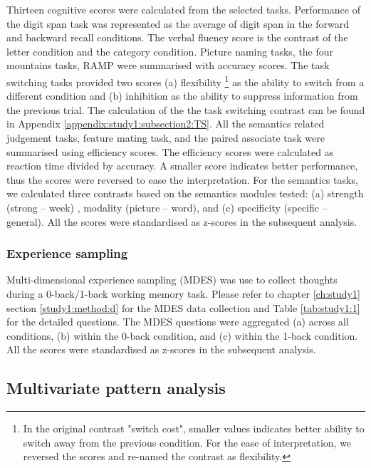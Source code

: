 Thirteen cognitive scores were calculated from the selected tasks. Performance of the digit span task was represented as the average of digit span in the forward and backward recall conditions. The verbal fluency score is the contrast of the letter condition and the category condition. Picture naming tasks, the four mountains tasks, RAMP were summarised with accuracy scores. The task switching tasks provided two scores (a) flexibility
\footnote{In the original contrast "switch cost", smaller values indicates better ability to switch away from the previous condition. For the ease of interpretation, we reversed the scores and re-named the contrast as flexibility.} 
as the ability to switch from a different condition and (b) inhibition as the ability to suppress information from the previous trial. The calculation of the the task switching contrast can be found in Appendix \ref{appendix:study1:subsection2:TS}. All the semantics related judgement tasks, feature mating task, and the paired associate task were summarised using efficiency scores. The efficiency scores were calculated as reaction time divided by accuracy. A smaller score indicates better performance, thus the scores were reversed to ease the interpretation. For the semantics tasks, we calculated three contrasts based on the semantics modules tested: (a) strength (strong -- week) , modality (picture -- word), and (c) specificity (specific -- general). All the scores were standardised as z-scores in the subsequent analysis. 

\subsubsection{Experience sampling}
\label{study3:method:e:mdes}
Multi-dimensional experience sampling (MDES) was use to collect thoughts during a 0-back/1-back working memory task. Please refer to chapter \ref{ch:study1} section \ref{study1:method:d} for the MDES data collection and Table \ref{tab:study1:1} for the detailed questions. The MDES questions were aggregated (a) across all conditions, (b) within the 0-back condition, and (c) within the 1-back condition. All the scores were standardised as z-scores in the subsequent analysis.  

\subsection{Multivariate pattern analysis}
\label{study3:method:f}
